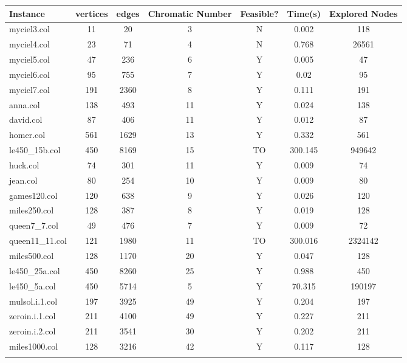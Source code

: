 \documentclass{article}
\begin{document}
\begin{center}
\renewcommand{\arraystretch}{1.4}
 \begin{tabular}{lcccccc}
	\hline
\textbf{Instance}  & \textbf{vertices} & \textbf{edges}  & \textbf{Chromatic Number} & \textbf{Feasible?} & \textbf{Time(s)} & \textbf{Explored Nodes} \\\hline

myciel3.col & 11 & 20 & 3 & N & 0.002 & 118 \\ 
myciel4.col & 23 & 71 & 4 & N & 0.768 & 26561 \\ 
myciel5.col & 47 & 236 & 6 & Y & 0.005 & 47 \\ 
myciel6.col & 95 & 755 & 7 & Y & 0.02 & 95 \\ 
myciel7.col & 191 & 2360 & 8 & Y & 0.111 & 191 \\ 
anna.col & 138 & 493 & 11 & Y & 0.024 & 138 \\ 
david.col & 87 & 406 & 11 & Y & 0.012 & 87 \\ 
homer.col & 561 & 1629 & 13 & Y & 0.332 & 561 \\ 
le450\_15b.col & 450 & 8169 & 15 & TO & 300.145 & 949642 \\ 
huck.col & 74 & 301 & 11 & Y & 0.009 & 74 \\ 
jean.col & 80 & 254 & 10 & Y & 0.009 & 80 \\ 
games120.col & 120 & 638 & 9 & Y & 0.026 & 120 \\ 
miles250.col & 128 & 387 & 8 & Y & 0.019 & 128 \\ 
queen7\_7.col & 49 & 476 & 7 & Y & 0.009 & 72 \\ 
queen11\_11.col & 121 & 1980 & 11 & TO & 300.016 & 2324142 \\ 
miles500.col & 128 & 1170 & 20 & Y & 0.047 & 128 \\ 
le450\_25a.col & 450 & 8260 & 25 & Y & 0.988 & 450 \\ 
le450\_5a.col & 450 & 5714 & 5 & Y & 70.315 & 190197 \\ 
mulsol.i.1.col & 197 & 3925 & 49 & Y & 0.204 & 197 \\ 
zeroin.i.1.col & 211 & 4100 & 49 & Y & 0.227 & 211 \\ 
zeroin.i.2.col & 211 & 3541 & 30 & Y & 0.202 & 211 \\ 
miles1000.col & 128 & 3216 & 42 & Y & 0.117 & 128 \\ 

\\
\hline\end{tabular}
\end{center}
\end{document}
